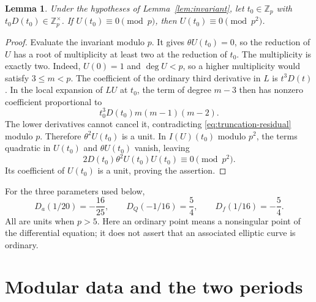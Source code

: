 \documentclass[11pt,a4paper]{article}
\newtheorem{lemma}[theorem]{Lemma}
\theoremstyle{remark}
\newcommand{\Zp}{\mathbb Z_p}
\begin{document}
\begin{lemma}\label{lem:lifting}
Under the hypotheses of Lemma~\ref{lem:invariant}, let $t_0\in\Zp$
with $t_0D(t_0)\in\Zp^\times$. If $U(t_0)\equiv0\pmod p$, then
$U(t_0)\equiv0\pmod{p^2}$.
\end{lemma}
\begin{proof}
Evaluate the invariant modulo $p$. It gives
$\theta U(t_0)=0$, so the reduction of $U$ has a root of multiplicity
at least two at the reduction of $t_0$. The multiplicity is exactly
two. Indeed, $U(0)=1$ and $\deg U<p$, so a higher multiplicity would
satisfy $3\le m<p$. The coefficient of the ordinary third derivative
in $L$ is $t^3D(t)$. In the local expansion of $LU$ at $t_0$, the
term of degree $m-3$ then has nonzero coefficient proportional to
\[
 t_0^3D(t_0)m(m-1)(m-2).
\]
The lower derivatives cannot cancel it, contradicting
\eqref{eq:truncation-residual} modulo $p$. Therefore
$\theta^2U(t_0)$ is a unit. In $I(U)(t_0)$ modulo $p^2$, the terms
quadratic in $U(t_0)$ and $\theta U(t_0)$ vanish, leaving
\[
 2D(t_0)\theta^2U(t_0)U(t_0)\equiv0\pmod{p^2}.
\]
Its coefficient of $U(t_0)$ is a unit, proving the assertion.
\end{proof}

For the three parameters used below,
\begin{equation}\label{eq:D-values}
 D_a(1/20)=-\frac{16}{25},\qquad
 D_Q(-1/16)=\frac54,\qquad D_f(1/16)=-\frac54.
\end{equation}
All are units when $p>5$. Here an ordinary point means a nonsingular
point of the differential equation; it does not assert that an
associated elliptic curve is ordinary.

\section{Modular data and the two periods}\label{sec:periods}
\end{document}
